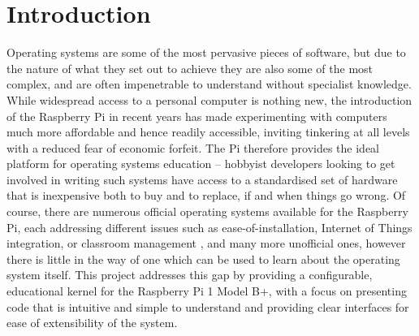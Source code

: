 \section*{Introduction}
    Operating systems are some of the most pervasive pieces of software, but due
    to the nature of what they set out to achieve they are also some of the most
    complex, and are often impenetrable to understand without specialist
    knowledge. While widespread access to a personal computer is nothing new,
    the introduction of the Raspberry Pi in recent years has made experimenting
    with computers much more affordable and hence readily accessible, inviting
    tinkering at all levels with a reduced fear of economic forfeit. The Pi
    therefore provides the ideal platform for operating systems education --
    hobbyist developers looking to get involved in writing such systems have
    access to a standardised set of hardware that is inexpensive both to buy and
    to replace, if and when things go wrong. Of course, there are numerous
    official operating systems available for the Raspberry Pi, each addressing
    different issues such as ease-of-installation, Internet of Things
    integration, or classroom management \cite{OSes}, and many more unofficial ones,
    however there is little in the way of one which can be used to learn about
    the operating system itself. This project addresses this gap by providing a
    configurable, educational kernel for the Raspberry Pi 1 Model B+, with a
    focus on presenting code that is intuitive and simple to understand and
    providing clear interfaces for ease of extensibility of the system.

